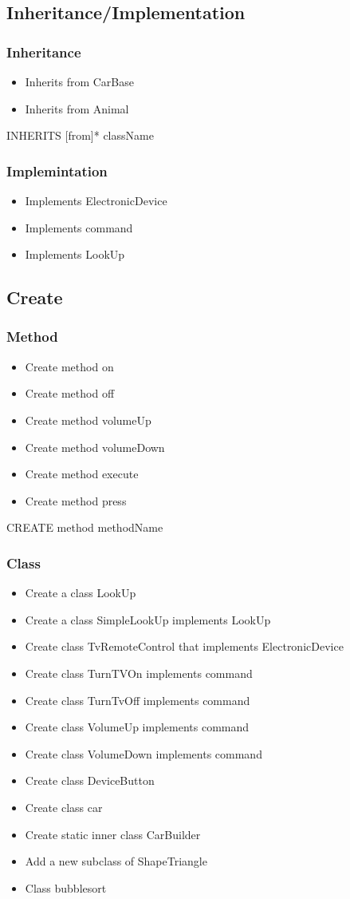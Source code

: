 \subsection{Inheritance/Implementation}
\subsubsection{Inheritance}
\begin{itemize}
	\item Inherits from CarBase
	\item Inherits from Animal
\end{itemize}
INHERITS [from]* {className}
\subsubsection{Implemintation}
\begin{itemize}
	\item Implements ElectronicDevice
	\item Implements command
	\item Implements LookUp
\end{itemize}
\subsection{Create}
\subsubsection{Method}
\begin{itemize}
	\item Create method on
	\item Create method off
	\item Create method volumeUp
	\item Create method volumeDown
	\item Create method execute
	\item Create method press
\end{itemize}
CREATE method {methodName}
\subsubsection{Class}
\begin{itemize}
	\item Create a class LookUp
	\item Create a class SimpleLookUp implements LookUp
	\item Create class TvRemoteControl that implements ElectronicDevice
	\item Create class TurnTVOn implements command
	\item Create class TurnTvOff implements command
	\item Create class VolumeUp implements command
	\item Create class VolumeDown implements command
	\item Create class DeviceButton
	\item Create class car
	\item Create static inner class CarBuilder
	\item Add a new subclass of ShapeTriangle
	\item Class bubblesort
\end{itemize}

